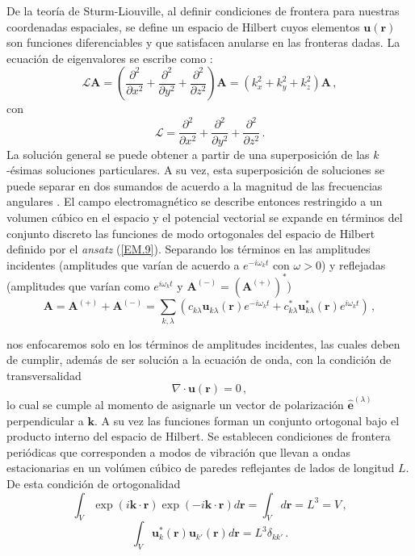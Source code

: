 De la teoría de Sturm-Liouville, al definir condiciones de frontera para nuestras coordenadas espaciales, se define un espacio de Hilbert cuyos elementos $\mathbf{u}(\mathbf{r})$ son funciones diferenciables y que satisfacen anularse en las fronteras dadas. La ecuación de eigenvalores se escribe como \cite{Arfken}:
\begin{equation}
\label{EM.10}
\mathcal{L} \mathbf{A} = \left( \frac{\partial^2}{\partial x^2} + \frac{\partial^2}{\partial y^2} + \frac{\partial^2}{\partial z^2} \right) \mathbf{A} = (k_x^2 + k_y^2 + k_z^2) \mathbf{A} \,,
\end{equation}
con
\begin{equation}
\label{EM.11}
\mathcal{L} = \frac{\partial^2}{\partial x^2} + \frac{\partial^2}{\partial y^2} + \frac{\partial^2}{\partial z^2} \,.
\end{equation}
La solución general se puede obtener a partir de una superposición de las $k$-ésimas soluciones particulares. A su vez, esta superposición de soluciones se puede separar en dos sumandos de acuerdo a la magnitud de las frecuencias angulares \cite{Riley}. El campo electromagn\'etico se describe entonces restringido a un volumen cúbico en el espacio y el potencial vectorial se expande en términos del conjunto discreto las funciones de modo ortogonales del espacio de Hilbert definido por el \textit{ansatz} (\ref{EM.9}). Separando los términos en las amplitudes incidentes (amplitudes que varían de acuerdo a $e^{-i\omega_k t}$ con $\omega>0$) y reflejadas (amplitudes que varían como $e^{i\omega_k t }$ y $\mathbf{A}^{(-)} = (\mathbf{A}^{(+)})^*$) \cite{Griffiths}
\begin{equation}
\label{EM.12}
\mathbf{A} = \mathbf{A}^{(+)} + \mathbf{A}^{(-)} = \sum_{k,\lambda} \left( c_{k\lambda} \mathbf{u}_{k\lambda} (\mathbf{r})e^{-i\omega_k t} +  c_{k\lambda}^* \mathbf{u}_{k\lambda}^* (\mathbf{r})e^{i\omega_{k} t} \right) \,,
\end{equation}

nos enfocaremos solo en los términos de amplitudes incidentes, las cuales deben de cumplir, además de ser solución a la ecuación de onda, con la condición de transversalidad
\begin{equation}
\label{EM.13}	
\nabla \cdot \mathbf{u}(\mathbf{r}) = 0 \,,
\end{equation}
lo cual se cumple al momento de asignarle un vector de polarización $\mathbf{\hat{e}}^{(\lambda)}$ perpendicular a $\mathbf{k}$. A su vez las funciones forman un conjunto ortogonal bajo el producto interno del espacio de Hilbert. Se establecen condiciones de frontera periódicas que corresponden a modos de vibración que llevan a ondas estacionarias en un volúmen cúbico de paredes reflejantes de lados de longitud $L$. De esta condición de ortogonalidad
\begin{equation*}
\int_V \exp{(i\mathbf{k}\cdot\mathbf{r})} \exp{(-i\mathbf{k}\cdot\mathbf{r})} d\mathbf{r}
=  \int_V d\mathbf{r}
=  L^3 = V \,,
\end{equation*}
\begin{equation}
\label{EM.14}
\int_V \mathbf{u}^{*}_k(\mathbf{r}) \mathbf{u}_{k'}(\mathbf{r}) d\mathbf{r} = L^3\delta_{kk'} \,.
\end{equation}

